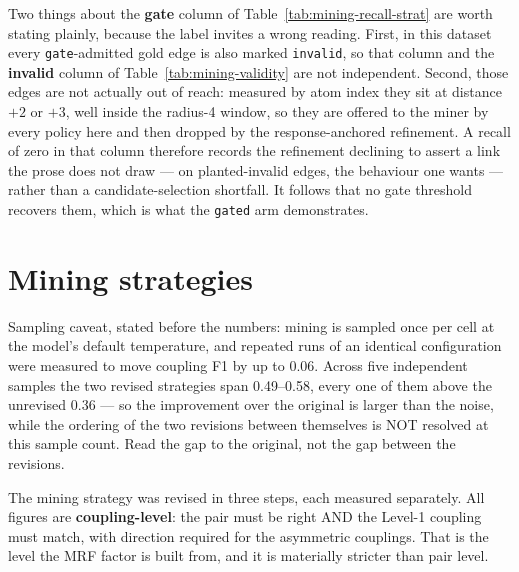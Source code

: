 \documentclass[11pt]{article}
\begin{document}
Two things about the \textbf{gate} column of Table~\ref{tab:mining-recall-strat} are worth stating plainly, because the label invites a wrong reading. First, in this dataset every \texttt{gate}-admitted gold edge is also marked \texttt{invalid}, so that column and the \textbf{invalid} column of Table~\ref{tab:mining-validity} are not independent. Second, those edges are not actually out of reach: measured by atom index they sit at distance $+2$ or $+3$, well inside the radius-4 window, so they are offered to the miner by every policy here and then dropped by the response-anchored refinement. A recall of zero in that column therefore records the refinement declining to assert a link the prose does not draw --- on planted-invalid edges, the behaviour one wants --- rather than a candidate-selection shortfall. It follows that no gate threshold recovers them, which is what the \texttt{gated} arm demonstrates.

\section{Mining strategies}\label{sec:strategies}

Sampling caveat, stated before the numbers: mining is sampled once per cell at the model's default temperature, and repeated runs of an identical configuration were measured to move coupling F1 by up to 0.06. Across five independent samples the two revised strategies span 0.49--0.58, every one of them above the unrevised 0.36 --- so the improvement over the original is larger than the noise, while the ordering of the two revisions between themselves is NOT resolved at this sample count. Read the gap to the original, not the gap between the revisions.

The mining strategy was revised in three steps, each measured separately. All figures are \textbf{coupling-level}: the pair must be right AND the Level-1 coupling must match, with direction required for the asymmetric couplings. That is the level the MRF factor is built from, and it is materially stricter than pair level.
\end{document}
